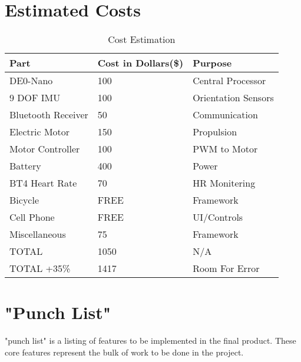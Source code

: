\documentclass[12pt,article]{IEEEtran}
\begin{document}
\section{Estimated Costs}
    \begin{table}[H]
		\renewcommand{\arraystretch}{1.3}
			\caption{Cost Estimation}
			
			\label{Team Hour Summary}
			
			\centering
			\begin{tabular}{p{3cm}|p{2cm}|p{3cm}}
			\hline
			\bfseries 	Part 				& \bfseries Cost in Dollars(\$) & \bfseries Purpose     \\
			\hline\hline
						DE0-Nano 		    & 100							&	Central Processor   \\
						9 DOF IMU    		& 100			            	&   Orientation Sensors	\\	
						Bluetooth Receiver	& 50				            &   Communication       \\	
						Electric Motor		& 150				            &   Propulsion        	\\
                        Motor Controller    & 100							&	PWM to Motor        \\
						Battery     		& 400			            	&   Power           	\\	
						BT4 Heart Rate  	& 70				            &   HR Monitering       \\	
						Bicycle     		& FREE				            &   Framework        	\\
                        Cell Phone          & FREE                          &   UI/Controls         \\
                    	Miscellaneous		& 75				            &   Framework        	\\
                        TOTAL               & 1050                          &   N/A                 \\        
                        \hline
                        TOTAL +35\%         & 1417                          &   Room For Error      \\        
			            \hline
			\end{tabular}
		\end{table}

\section{"Punch List"}
	 "punch list" is a listing of features to be implemented in the final
	product. These core features represent the bulk of work to be done in the project. 
\end{document}
